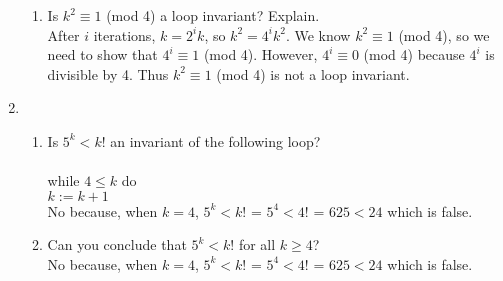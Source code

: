 \documentclass[12pt]{article}
\begin{document}
\begin{enumerate}
\begin{enumerate}
	\item Is $k^2\equiv 1$ (mod 4) a loop invariant? Explain.\\
	After $i$ iterations, $k=2^ik$, so $k^2 = 4^ik^2$. We know $k^2\equiv 1$ (mod 4), so we need to 		show that $4^i\equiv 1$ (mod 4). However, $4^i\equiv 0$ (mod 4) because $4^i$ is divisible by 4. Thus 
	 $k^2\equiv 1$ (mod 4) is not a loop invariant.
	\end{enumerate}
	
\setcounter{enumi}{21}
\item
	\begin{enumerate}
	\item Is $5^k < k!$ an invariant of the following loop?\\ \\
	while $4\leq k$ do\\
	$k:=k+1$\\
	No because, when $k=4$, $5^k < k!$ = $5^4<4!$ = $625<24$ which is false.

	\item Can you conclude that $5^k < k!$ for all $k\geq4$?\\
	No because, when $k=4$, $5^k < k!$ = $5^4<4!$ = $625<24$ which is false.
	\end{enumerate}
\end{enumerate}

\end{document}
